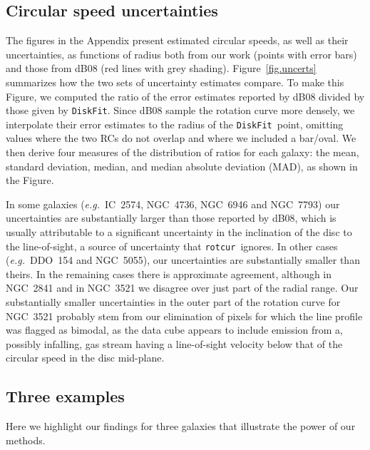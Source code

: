 \documentclass[letterpaper,fleqn,usenatbib]{mnras}
\def\eg{{\it e.g.}}
\def\DFt{{\tt DiskFit}}
\def\rtc{{\tt rotcur}}
\begin{document}
\subsection{Circular speed uncertainties}
The figures in the Appendix present estimated circular speeds, as well
as their uncertainties, as functions of radius both from our work
(points with error bars) and those from dB08 (red lines with grey
shading).  Figure~\ref{fig.uncerts} summarizes how the two sets of
uncertainty estimates compare.  To make this Figure, we computed the
ratio of the error estimates reported by dB08 divided by those given
by \DFt.  Since dB08 sample the rotation curve more densely, we
interpolate their error estimates to the radius of the \DFt\ point,
omitting values where the two RCs do not overlap and where we included
a bar/oval.  We then derive four measures of the distribution of
ratios for each galaxy: the mean, standard deviation, median, and
median absolute deviation (MAD), as shown in the Figure.

In some galaxies (\eg\ IC~2574, NGC~4736, NGC~6946 and NGC~7793) our
uncertainties are substantially larger than those reported by dB08,
which is usually attributable to a significant uncertainty in the
inclination of the disc to the line-of-sight, a source of uncertainty
that \rtc\ ignores.  In other cases (\eg\ DDO~154 and NGC~5055), our
uncertainties are substantially smaller than theirs.  In the remaining
cases there is approximate agreement, although in NGC~2841 and in
NGC~3521 we disagree over just part of the radial range.  Our
substantially smaller uncertainties in the outer part of the rotation
curve for NGC~3521 probably stem from our elimination of pixels for
which the line profile was flagged as bimodal, as the data cube
appears to include emission from a, possibly infalling, gas stream
having a line-of-sight velocity below that of the circular speed in
the disc mid-plane.

\subsection{Three examples}
Here we highlight our findings for three galaxies that illustrate
the power of our methods.
\end{document}
